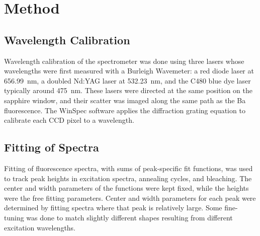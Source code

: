\chapter{Method}

\section{Wavelength Calibration}

Wavelength calibration of the spectrometer was done using three lasers whose wavelengths were first measured with a Burleigh Wavemeter:  a red diode laser at 656.99~nm, a doubled Nd:YAG laser at 532.23~nm, and the C480 blue dye laser typically around 475~nm.  These lasers were directed at the same position on the sapphire window, and their scatter was imaged along the same path as the Ba fluorescence.  The WinSpec software applies the diffraction grating equation to calibrate each CCD pixel to a wavelength.

\section{Fitting of Spectra}
\label{sec:fitting}

Fitting of fluorescence spectra, with sums of peak-specific fit functions, was used to track peak heights in excitation spectra, annealing cycles, and bleaching.  The center and width parameters of the functions were kept fixed, while the heights were the free fitting parameters.  Center and width parameters for each peak were determined by fitting spectra where that peak is relatively large.  Some fine-tuning was done to match slightly different shapes resulting from different excitation wavelengths.

